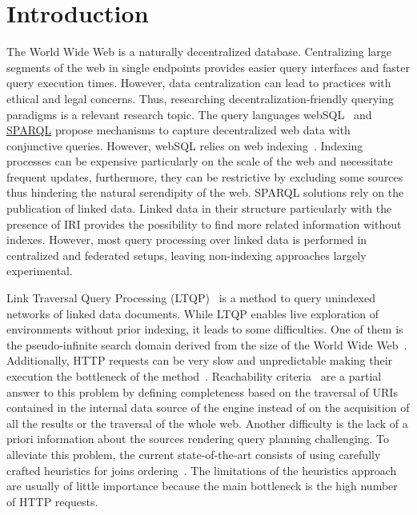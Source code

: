 \section{Introduction}

The World Wide Web is a naturally decentralized database.
Centralizing large segments of the web in single endpoints provides easier query interfaces and faster query execution times.
However, data centralization can lead to practices with ethical and legal concerns.
Thus, researching decentralization-friendly querying paradigms is a relevant research topic.
The query languages webSQL~\cite{Mendelzon1996} and \href{https://www.w3.org/TR/sparql11-query/}{SPARQL} propose mechanisms to capture decentralized web data with conjunctive queries.
However, webSQL relies on web indexing~\cite{Mendelzon1996}.
Indexing processes can be expensive particularly on the scale of the web and necessitate frequent updates, furthermore, they can be restrictive by excluding some sources thus hindering the natural serendipity of the web.
SPARQL solutions rely on the publication of linked data.
Linked data in their structure particularly with the presence of IRI provides the possibility to find more related information without indexes.
However, most query processing over linked data is performed in centralized and federated setups, leaving non-indexing approaches largely experimental.

Link Traversal Query Processing (LTQP)~\cite{Hartig2012} is a method to query unindexed networks of linked data documents.
While LTQP enables live exploration of environments without prior indexing, it leads to some difficulties.
One of them is the pseudo-infinite search domain derived from the size of the World Wide Web~\cite{hartig2016walking}.
Additionally, HTTP requests can be very slow and unpredictable making their execution the bottleneck of the method~\cite{hartig2016walking}.
Reachability criteria~\cite{Hartig2012} are a partial answer to this problem by defining completeness based on the traversal of URIs
contained in the internal data source of the engine instead of on the acquisition of all the results or the traversal of the whole web.
Another difficulty is the lack of a priori information about the sources rendering query planning challenging.
To alleviate this problem, the current state-of-the-art consists of using carefully crafted heuristics for joins ordering~\cite{Hartig2011}.
The limitations of the heuristics approach are usually of little importance because the main bottleneck is the high number of HTTP requests.


